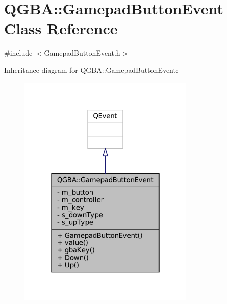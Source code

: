 \hypertarget{class_q_g_b_a_1_1_gamepad_button_event}{}\section{Q\+G\+BA\+:\+:Gamepad\+Button\+Event Class Reference}
\label{class_q_g_b_a_1_1_gamepad_button_event}


{\ttfamily \#include $<$Gamepad\+Button\+Event.\+h$>$}



Inheritance diagram for Q\+G\+BA\+:\+:Gamepad\+Button\+Event\+:
\nopagebreak
\begin{figure}[H]
\begin{center}
\leavevmode
\includegraphics[width=238pt]{class_q_g_b_a_1_1_gamepad_button_event__inherit__graph}
\end{center}
\end{figure}


